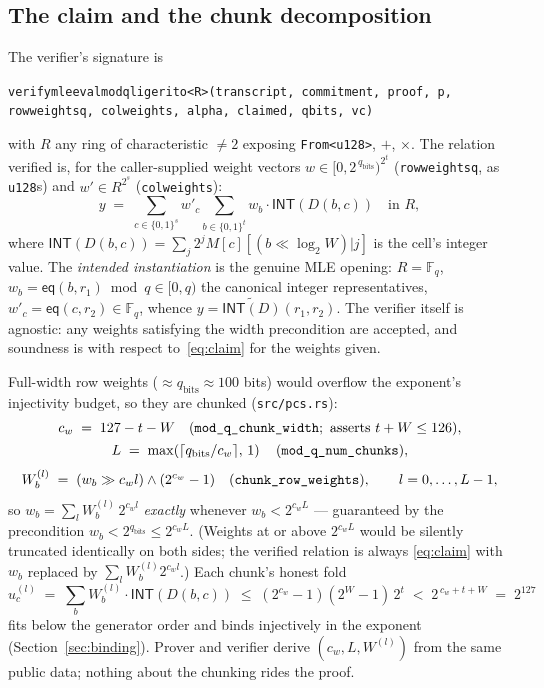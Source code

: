 \documentclass[11pt]{article}
\newcommand{\F}{\mathbb{F}}
\newcommand{\Fq}{\F_q}                 %
\newcommand{\bits}{\{0,1\}}
\newcommand{\INT}{\mathsf{INT}}
\newcommand{\mle}[1]{\widetilde{#1}}
\newcommand{\eq}{\mathsf{eq}}
\newcommand{\cw}{c_w}
\newcommand{\code}[1]{{\def\_{\textunderscore\allowbreak}\texttt{#1}}}
\begin{document}
\subsection{The claim and the chunk decomposition}

The verifier's signature is
\begin{center}\small
\code{verify\_mle\_eval\_mod\_q\_ligerito<R>(transcript, commitment, proof, p,
row\_weights\_q, col\_weights, alpha, claimed, q\_bits, vc)}
\end{center}
with $R$ any ring of characteristic $\ne 2$ exposing
\code{From<u128>}, $+$, $\times$.  The relation verified is, for the
caller-supplied weight vectors
$w \in [0, 2^{\,q_{\mathrm{bits}}})^{2^t}$ (\code{row\_weights\_q}, as
\code{u128}s) and $w' \in R^{2^s}$ (\code{col\_weights}):
\begin{equation}\label{eq:claim}
  y \;=\; \sum_{c \in \bits^s} w'_c \sum_{b \in \bits^t} w_b \cdot \INT(D(b,c))
  \quad\text{in } R,
\end{equation}
where $\INT(D(b,c)) = \sum_j 2^j M[c][(b \ll \log_2 W)|j]$ is the cell's
integer value.  The \emph{intended instantiation} is the genuine MLE
opening: $R = \Fq$, $w_b = \eq(b, r_1) \bmod q \in [0,q)$ the canonical
integer representatives, $w'_c = \eq(c, r_2) \in \Fq$, whence
$y = \mle{\INT(D)}(r_1, r_2)$.  The verifier itself is agnostic: any
weights satisfying the width precondition are accepted, and soundness is
with respect to~\eqref{eq:claim} for the weights given.

Full-width row weights ($\approx q_{\mathrm{bits}} \approx 100$ bits)
would overflow the exponent's injectivity budget, so they are chunked
(\code{src/pcs.rs}):
\begin{gather*}
  \cw \;=\; 127 - t - W \quad (\code{mod\_q\_chunk\_width};\ \text{asserts } t + W \le 126),
  \\[1pt]
  L \;=\; \max\!\left(\lceil q_{\mathrm{bits}} / \cw \rceil,\, 1\right)
  \quad (\code{mod\_q\_num\_chunks}),
\end{gather*}
\[
  W^{(l)}_b \;=\; (w_b \gg \cw l) \wedge (2^{\cw} - 1)
  \quad (\code{chunk\_row\_weights}), \qquad l = 0, \dots, L-1,
\]
so $w_b = \sum_l W^{(l)}_b\, 2^{\cw l}$ \emph{exactly} whenever
$w_b < 2^{\cw L}$ — guaranteed by the precondition
$w_b < 2^{q_{\mathrm{bits}}} \le 2^{\cw L}$.  (Weights at or above
$2^{\cw L}$ would be silently truncated identically on both sides; the
verified relation is always \eqref{eq:claim} with $w_b$ replaced by
$\sum_l W^{(l)}_b 2^{\cw l}$.)  Each chunk's honest fold
\begin{equation}\label{eq:chunkfold}
  u^{(l)}_c \;=\; \sum_b W^{(l)}_b \cdot \INT(D(b,c))
  \;\le\; (2^{\cw}-1)(2^W-1)\,2^{t} \;<\; 2^{\,\cw + t + W} \;=\; 2^{127}
\end{equation}
fits below the generator order and binds injectively in the exponent
(Section~\ref{sec:binding}).  Prover and verifier derive
$(\cw, L, W^{(l)})$ from the same public data; nothing about the chunking
rides the proof.
\end{document}
